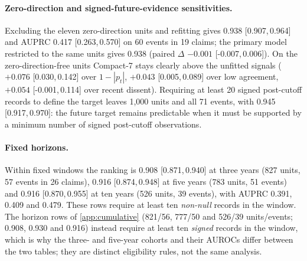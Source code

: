 \documentclass[11pt]{article}
\newcommand{\compact}{Compact-7\xspace}
\newcommand{\ci}[2]{[#1,\,#2]}
\begin{document}
\paragraph{Zero-direction and signed-future-evidence sensitivities.} Excluding the eleven zero-direction units
and refitting gives 0.938 \ci{0.907}{0.964} and AUPRC 0.417 \ci{0.263}{0.570} on 60 events in 19
claims; the primary model restricted to the same units gives 0.938 (paired $\Delta$ $-0.001$
\ci{-0.007}{0.006}). On the zero-direction-free units \compact stays clearly above the unfitted signals
($+0.076$ \ci{0.030}{0.142} over $1-|p_t|$, $+0.043$ \ci{0.005}{0.089} over low agreement, $+0.054$
\ci{-0.001}{0.114} over recent dissent). Requiring at least 20 signed post-cutoff records to define
the target leaves 1{,}000 units and all 71 events, with 0.945 \ci{0.917}{0.970}: the future target
remains predictable when it must be supported by a minimum number of signed post-cutoff
observations.

\paragraph{Fixed horizons.} Within fixed windows the ranking is 0.908 \ci{0.871}{0.940} at three
years (827 units, 57 events in 26 claims), 0.916 \ci{0.874}{0.948} at five years (783 units, 51
events) and 0.916 \ci{0.870}{0.955} at ten years (526 units, 39 events), with AUPRC 0.391, 0.409
and 0.479. These rows require at least ten \emph{non-null} records in the window. The horizon rows
of \cref{app:cumulative} (821/56, 777/50 and 526/39 units/events; 0.908, 0.930 and 0.916)
instead require at least ten \emph{signed} records in the window, which is why the three- and
five-year cohorts and their AUROCs differ between the two tables; they are distinct eligibility
rules, not the same analysis.
\end{document}
